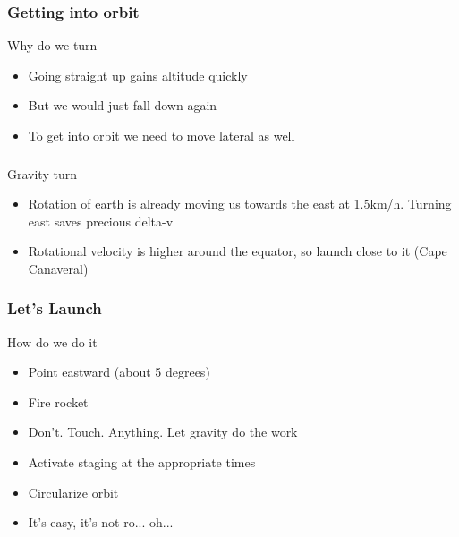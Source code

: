 {
%
\begin{frame}
\end{frame}
\begin{frame}
    \frametitle{Getting into orbit}
    \begin{block}{Why do we turn}
        \begin{itemize}
            \item Going straight up gains altitude quickly
            \item But we would just fall down again
            \item To get into orbit we need to move lateral as well
        \end{itemize}
    \end{block}
\end{frame}
\begin{frame}
    \frametitle{}
    \begin{block}{Gravity turn}
        \begin{itemize}
            \item Rotation of earth is already moving us towards the east at 1.5km/h. Turning east saves precious delta-v
            \item Rotational velocity is higher around the equator, so launch close to it (Cape Canaveral)
        \end{itemize}
    \end{block}
\end{frame}
\begin{frame}
    \frametitle{Let's Launch}
    \begin{block}{How do we do it}
        \begin{itemize}
            \item Point eastward (about 5 degrees)
            \item Fire rocket
            \item Don't. Touch. Anything. Let gravity do the work
            \item Activate staging at the appropriate times
            \item Circularize orbit
            \item It's easy, it's not ro... oh...
        \end{itemize}
    \end{block}
\end{frame}
}

